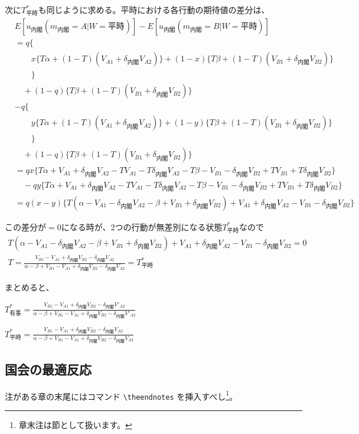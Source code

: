 \documentclass[main.tex]{subfiles}
\begin{document}
次に$T^*_{平時}$も同じように求める。平時における各行動の期待値の差分は、
\begin{align*}
    & E[u_{内閣}(m_{内閣}=A|W=平時)] - E[u_{内閣}(m_{内閣}=B|W=平時)]\\
    & = q\lbrace \\
    & \quad\quad x \lbrace T\alpha + (1-T)(V_{A1} + \delta_{内閣} V_{A2}) \rbrace + (1-x)\lbrace T\beta + (1-T)(V_{B1} + \delta_{内閣} V_{B2}) \rbrace \\
    & \quad\quad \rbrace\\
    & \quad +(1-q)\lbrace T\beta + (1-T)(V_{B1} + \delta_{内閣} V_{B2}) \rbrace\\
    & - q\lbrace \\
    & \quad\quad y \lbrace T\alpha + (1-T)(V_{A1} + \delta_{内閣} V_{A2}) \rbrace + (1-y)\lbrace T\beta + (1-T)(V_{B1} + \delta_{内閣} V_{B2}) \rbrace \\
    & \quad\quad \rbrace\\
    & \quad +(1-q)\lbrace T\beta + (1-T)(V_{B1} + \delta_{内閣} V_{B2}) \rbrace\\
    & = qx \lbrace T\alpha + V_{A1} + \delta_{内閣}V_{A2} - TV_{A1} - T\delta_{内閣}V_{A2} - T\beta -V_{B1} -\delta_{内閣}V_{B2} + TV_{B1} + T\delta_{内閣}V_{B2} \rbrace\\
    & \quad -qy\lbrace T\alpha + V_{A1} + \delta_{内閣}V_{A2} - TV_{A1} - T\delta_{内閣}V_{A2} - T\beta -V_{B1} -\delta_{内閣}V_{B2} + TV_{B1} + T\delta_{内閣}V_{B2} \rbrace\\
    & = q(x-y)\lbrace T(\alpha -V_{A1} -\delta_{内閣}V_{A2} - \beta + V_{B1} + \delta_{内閣}V_{B2}) + V_{A1} + \delta_{内閣}V_{A2} - V_{B1} - \delta_{内閣}V_{B2}  \rbrace
\end{align*}

この差分が$=0$になる時が、2つの行動が無差別になる状態$T^*_{平時}$なので
\begin{gather*}
    T(\alpha -V_{A1} -\delta_{内閣}V_{A2} - \beta + V_{B1} + \delta_{内閣}V_{B2}) + V_{A1} + \delta_{内閣}V_{A2} - V_{B1} - \delta_{内閣}V_{B2} = 0\\
    T = \frac{ V_{B1} - V_{A1} +\delta_{内閣}V_{B2} - \delta_{内閣}V_{A2} }{ \alpha-\beta + V_{B1}-V_{A1} + \delta_{内閣}V_{B2} - \delta_{内閣}V_{A2} }
    = T^*_{平時}
\end{gather*}

まとめると、
\begin{definition} $T^*_{有事} = \frac{ V_{B1} - V_{A1} +\delta_{内閣}V_{B2} - \delta_{内閣}V'_{A2} }{ \alpha-\beta + V_{B1}-V_{A1} + \delta_{内閣}V_{B2} - \delta_{内閣}V'_{A2} }$ \end{definition}
\begin{definition} $T^*_{平時} = \frac{ V_{B1} - V_{A1} +\delta_{内閣}V_{B2} - \delta_{内閣}V_{A2} }{ \alpha-\beta + V_{B1}-V_{A1} + \delta_{内閣}V_{B2} - \delta_{内閣}V_{A2} }$ \end{definition}



\subsection{国会の最適反応}





\theendnotes %

注がある章の末尾にはコマンド \verb#\theendnotes# を挿入すべし\footnote{章末注は節として扱います。}。


\theendnotes %
\end{document}
